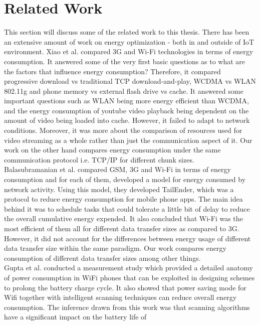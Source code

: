 \chapter{Related Work}
This section will discuss some of the related work to this thesis. There has been an extensive amount of work 
on energy optimization - both in and outside of IoT environment. Xiao et al. \cite{4756414} compared 3G and Wi-Fi 
technologies in terms of energy consumption. It answered some of the very first basic questions as to what are the 
factors that influence energy consumption? Therefore, it compared progressive download vs traditional TCP download-and-play, 
WCDMA vs WLAN 802.11g and phone memory vs external flash drive vs cache. It answered some important questions 
such as WLAN being more energy efficient than WCDMA, and the energy consumption of youtube video playback being 
dependent on the amount of video being loaded into cache. However, it failed to adapt to network conditions. Moreover, 
it was more about the comparison of resources used for video streaming as a whole rather than just the communication aspect of it. 
Our work on the other hand compares energy consumption under the same communication protocol i.e. TCP/IP for different 
chunk sizes. \\
Balasubramanian et al. \cite{confbal} compared GSM, 3G and Wi-Fi in terms of energy consumption and for each of them, 
developed a model for energy consumed by network activity. Using this model, they developed TailEnder, which was a 
protocol to reduce energy consumption for mobile phone apps. The main idea behind it was to schedule tasks that 
could tolerate a little bit of delay to reduce the overall cumulative energy expended. It also concluded that Wi-Fi 
was the most efficient of them all for different data transfer sizes as compared to 3G. However, it did not account for 
the differences between energy usage of different data transfer size within the same paradigm. Our work compares 
energy consumption of different data transfer sizes among other things. \\
Gupta et al. \cite{4292824} conducted a measurement study which provided a detailed anatomy of power consumption 
in WiFi phones that can be exploited in designing schemes to prolong the battery charge cycle. It also showed that 
power saving mode for Wifi together with intelligent scanning techniques can reduce overall energy consumption. 
The inference drawn from this work was that scanning algorithms have a significant impact on the battery life of 
